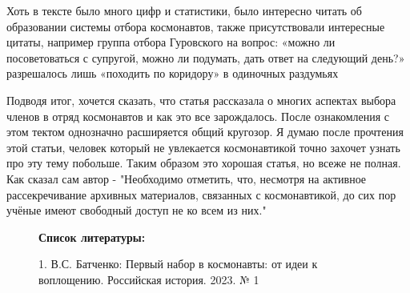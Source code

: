 Хоть в тексте было много цифр и статистики, было интересно читать об образовании системы отбора космонавтов, также присутствовали интересные цитаты, например группа отбора Гуровского на вопрос: «можно ли посоветоваться с супругой, можно ли подумать, дать
ответ на следующий день?» разрешалось лишь «походить по коридору» в одиночных раздумьях


Подводя итог, хочется сказать, что статья рассказала о многих аспектах выбора членов в отряд космонавтов и как это все зарождалось. После ознакомления с этом тектом однозначно расширяется общий кругозор. Я думаю после прочтения этой статьи, человек который не увлекается космонавтикой точно захочет узнать про эту тему побольше. Таким образом это хорошая статья, но всеже не полная. Как сказал сам автор - "Необходимо отметить, что, несмотря на активное рассекречивание архивных материалов, связанных с космонавтикой, до
сих пор учёные имеют свободный доступ не ко всем из них."


\begin{figure}[b]
	\Large{\textbf{Список литературы:}}

		1. В.С. Батченко: Первый набор в космонавты: от идеи к воплощению. Российская история. 2023. № 1

\end{figure}



